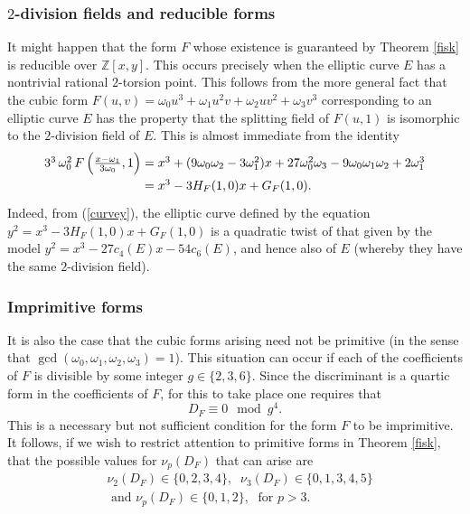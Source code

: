 \documentclass[11pt]{report}
\theoremstyle{definition}
\begin{document}
\subsubsection{$2$-division fields and reducible forms}
It might happen that the form $F$ whose existence is guaranteed by Theorem \ref{fisk} is reducible over $\mathbb{Z}[x,y]$. This occurs precisely when the elliptic curve $E$ has a nontrivial rational $2$-torsion point. This follows from the more general fact that the cubic form $F(u,v) =  \omega_0 u^3 + \omega_1 u^2v + \omega_2 uv^2 + \omega_3 v^3$ corresponding to an elliptic curve $E$ has the property that the splitting field of $F(u,1)$ is isomorphic to the $2$-division field of $E$. This is almost immediate from the identity
$$
\arraycolsep=1.4pt\def\arraystretch{1.4}
\begin{array}{ll}
3^3 \, \omega_0^2 \, F \left( \frac{x-\omega_1}{3 \omega_0},1 \right) & = x^3+(9 \omega_0 \omega_2-3 \omega_1^2) x+27 \omega_0^2 \omega_3-9 \omega_0 \omega_1 \omega_2+2 \omega_1^3 \\
 & = x^3 - 3 H_F(1,0) x  + G_F (1,0). \\
\end{array}
$$
Indeed, from (\ref{curvey}), the elliptic curve defined by the equation
$y^2=x^3 - 3 H_F(1,0) x  + G_F (1,0)$
is a quadratic twist of that given by the model $y^2 = x^3 -27 c_4(E) x -54 c_6(E)$, and hence also of $E$ (whereby they have the same $2$-division field).

\subsubsection{Imprimitive forms}
It is also the case that the cubic forms arising need not be primitive (in the sense that $\gcd
(\omega_0,\omega_1,\omega_2,\omega_3)=1$). This situation can occur if each of
the coefficients of $F$ is divisible by some integer $g \in \{ 2, 3, 6 \}$. Since the discriminant is a quartic form in the coefficients of $F$, for this to take place one requires that
$$
D_F \equiv 0 \mod{g^4}.
$$
This is a necessary but not sufficient condition for the form $F$ to be imprimitive. It follows, if we wish to restrict attention to primitive forms in Theorem \ref{fisk}, that the possible values for $\nu_p (D_F)$ that can arise are
\begin{align} \label{lumpy}
& \nu_2 (D_F) \in \{ 0, 2, 3, 4 \}, \; \;  \nu_3 (D_F) \in \{ 0, 1, 3, 4, 5 \} \\
& \mbox{ and } \nu_p (D_F) \in \{ 0, 1, 2 \}, \; \mbox{ for } p > 3.
\end{align}
\end{document}
